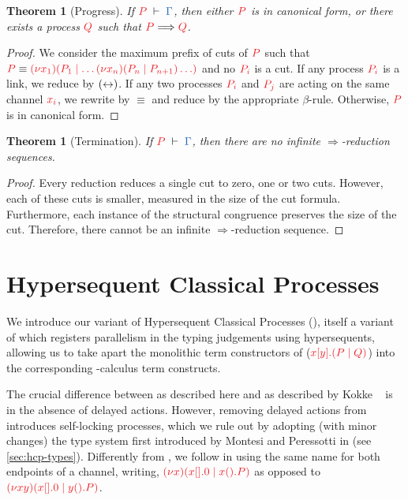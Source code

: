 \documentclass[copyright,creativecommons]{eptcs}
\newtheorem{theorem}[lemma]{Theorem}
\begin{document}
\begin{theorem}[Progress]\label{thm:cp-progress}
  If $\seq[P]{\Gamma}$, then either $\tm{P}$ is in canonical form, or there exists a process $\tm{Q}$ such that $\tm{P}\Longrightarrow\tm{Q}$.
\end{theorem} 
\begin{proof}
  We consider the maximum prefix of cuts of $\tm{P}$ such that $\tm{P} \equiv \tm{\cpCut{x_1}{P_1}{\dots\cpCut{x_n}{P_n}{P_{n+1}}\dots}}$ and no $\tm{P_i}$ is a cut. If any process $\tm{P_i}$ is a link, we reduce by $({\leftrightarrow})$. If any two processes $\tm{P_i}$ and $\tm{P_j}$ are acting on the same channel $\tm{x_i}$, we rewrite by $\equiv$ and reduce by the appropriate $\beta$-rule. Otherwise, $\tm{P}$ is in canonical form.
\end{proof}
\begin{theorem}[Termination]\label{thm:cp-termination}
  If $\seq[P]{\Gamma}$, then there are no infinite $\Longrightarrow$-reduction sequences.
\end{theorem} 
\begin{proof}
  Every reduction reduces a single cut to zero, one or two cuts. However, each of these cuts is smaller, measured in the size of the cut formula. Furthermore, each instance of the structural congruence preserves the size of the cut. Therefore, there cannot be an infinite $\Longrightarrow$-reduction sequence.
\end{proof}

\section{Hypersequent Classical Processes}
\label{sec:hcp}

We introduce our variant of Hypersequent Classical Processes (\hcp), itself a variant of \cp which registers parallelism in the typing judgements using hypersequents, allowing us to take apart the monolithic term constructors of \cp (\eg $\tm{\cpSend{x}{y}{P}{Q}}$) into the corresponding \textpi-calculus term constructs.

The crucial difference between \hcp as described here and \dhcp as described by Kokke \etal~\cite{kokke2019} is in the absence of delayed actions. However, removing delayed actions from \dhcp introduces self-locking processes, which we rule out by adopting (with minor changes) the type system first introduced by Montesi and Peressotti in \cite{montesi2018} (see \cref{sec:hcp-types}).
Differently from \loccit, we follow \cp in using the same name for both endpoints of a channel, writing, \eg $\tm{\cpCut{x}{\cpHalt{x}}{\cpWait{x}{P}}}$ as opposed to $\tm{\cpCut{xy}{\cpHalt{x}}{\cpWait{y}{P}}}$.
\end{document}
